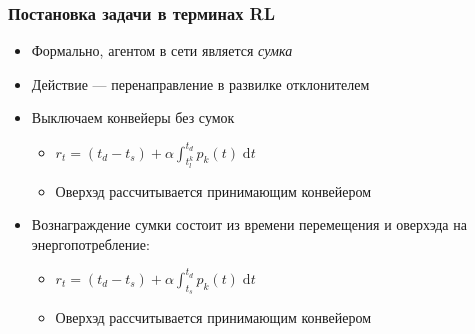 \documentclass{beamer}
\begin{document}
\begin{frame}
  \frametitle{Постановка задачи в терминах RL}
  \begin{itemize}
    \item Формально, агентом в сети является \textit{сумка}
    \item Действие --- перенаправление в развилке отклонителем
    \item Выключаем конвейеры без сумок
      \begin{itemize}
      \item $r_t = (t_d - t_s) + \alpha\int_{t_l^k}^{t_d} \! p_k(t) \; \mathrm{d}t$
      \item Оверхэд рассчитывается принимающим конвейером
      \end{itemize}

    \item Вознаграждение сумки состоит из времени перемещения и оверхэда на энергопотребление:
      \begin{itemize}
      \item $r_t = (t_d - t_s) + \alpha\int_{t_s}^{t_d} \! p_k(t) \; \mathrm{d}t$
      \item Оверхэд рассчитывается принимающим конвейером
      \end{itemize}
  \end{itemize}
\end{frame}

\end{document}
